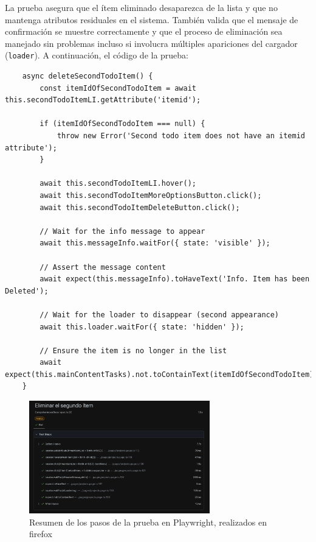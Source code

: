 \documentclass{report}
\begin{document}
La prueba asegura que el ítem eliminado desaparezca de la lista y que no mantenga atributos residuales en el sistema. También valida que el mensaje de confirmación se muestre correctamente y que el proceso de eliminación sea manejado sin problemas incluso si involucra múltiples apariciones del cargador (\texttt{loader}). A continuación, el código de la prueba:

\begin{lstlisting}
    async deleteSecondTodoItem() {
        const itemIdOfSecondTodoItem = await this.secondTodoItemLI.getAttribute('itemid');
    
        if (itemIdOfSecondTodoItem === null) {
            throw new Error('Second todo item does not have an itemid attribute');
        }
    
        await this.secondTodoItemLI.hover();
        await this.secondTodoItemMoreOptionsButton.click();
        await this.secondTodoItemDeleteButton.click();
    
        // Wait for the info message to appear
        await this.messageInfo.waitFor({ state: 'visible' });
    
        // Assert the message content
        await expect(this.messageInfo).toHaveText('Info. Item has been Deleted');
    
        // Wait for the loader to disappear (second appearance)
        await this.loader.waitFor({ state: 'hidden' });
    
        // Ensure the item is no longer in the list
        await expect(this.mainContentTasks).not.toContainText(itemIdOfSecondTodoItem);
    }
\end{lstlisting}
\begin{figure}[h!]
    \centering
    \includegraphics[width=0.7\textwidth]{./imgs/Captura de pantalla 2024-11-19 a la(s) 12.23.18.png}
    \caption{Resumen de los pasos de la prueba en Playwright, realizados en firefox}
    \label{fig:tc2playwright}
\end{figure}
\end{document}
